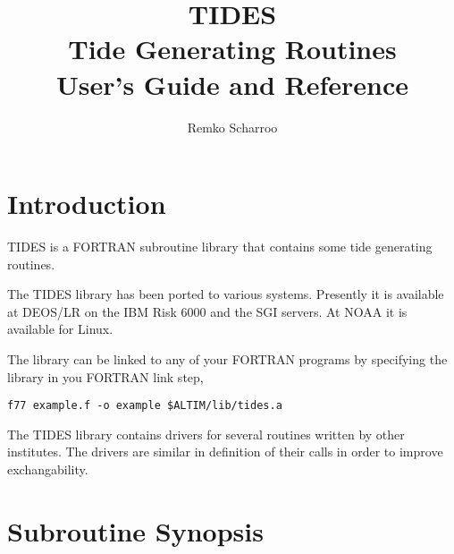 \documentclass[a4paper]{article}
\title{TIDES \\ Tide Generating Routines \\
User's Guide and Reference}
\author{Remko Scharroo}
\def\Input#1{\vbox{}}
\begin{document}
\tableofcontents

\section{Introduction}
TIDES is a FORTRAN subroutine library that contains some tide generating
routines.

The TIDES library has been ported to various systems.
Presently it is available at DEOS/LR on the IBM Risk 6000 and the SGI
servers. At NOAA it is available for Linux.

The library can be linked to any of your
FORTRAN programs by specifying the library in you FORTRAN link step, \eg
\begin{verbatim}
f77 example.f -o example $ALTIM/lib/tides.a
\end{verbatim}

The TIDES library contains drivers for several routines written by other
institutes. The drivers are similar in definition of their calls in order
to improve exchangability.

\section{Subroutine Synopsis}
\Input{airtide}
\Input{csrtide}
\Input{etide_ce}
\Input{festide}
\Input{gottide}
\Input{webtide}
\Input{lpetide}
\Input{poletide}
\end{document}
